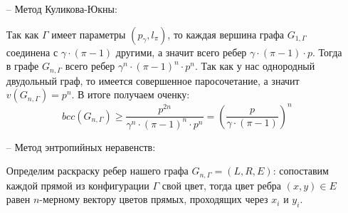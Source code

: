 \documentclass[a4paper]{article}
\newtheorem*{msolution}{Доказательство}
\newtheorem{mlemma}{Лемма}[section]
\begin{document}
\begin{itemize}[noitemsep]
     
     \begin{mlemma}
         Если в $G_{1, \Gamma}$ существует трудное множество размера $k$, то в $G_{n, \Gamma}$ 
         существует трудное множество размера $k^n$
     \end{mlemma}
     \begin{msolution}
        Докажем вначале, что если в графе $G_1$ имеется трудное множество размера $n_1$, а в графе 
        $G_2$ -- трудное множество размера $n_2$, тогда в $G_1 \otimes G_2$ можно найти трудное 
        множество размера $n_1\cdot n_2$ (где $\otimes$ - произведение Кронекера). Пусть $\{v_{i,j}\}$ 
        трудное множество в графе $G_1$, тогда в каждой подматрице $v_{i, j}\cdot G_2$ матрицы 
        графа $G_1 \otimes G_2$ рассмотрим клетки, соответствующие трудному множеству графа $G_2$. 
        Всего мы получили $n_1\cdot n_2$ клеток, образующих трудное множество графа $G_1 \otimes G_2$ 
        по построению.
        
        Вернемся к доказательству леммы. Так как матрица графа $G_{n, \Gamma}$ есть не что иное, как 
        Кронекерово произведение $n$ матриц графа $G_{1, \Gamma}$, то мы можем найти трудное множество 
        размера $k^n$. $\square$
     \end{msolution}
     
     В итоге мы получили, что если $\Gamma$ является аналогом полного двудольного графа, то 
     $$bcc(G_{n, \Gamma}) \geq 2^n$$ иначе $$bcc(G_{n, \Gamma}) \geq 3^n$$
     
     \item[--] Метод Куликова-Юкны:
     
     Так как $\Gamma$ имеет параметры $(p_{\gamma}, l_{\pi})$, то каждая вершина графа $G_{1,\Gamma}$ 
     соединена с $\gamma\cdot (\pi - 1)$ другими, а значит всего ребер $\gamma\cdot (\pi - 1)\cdot p$. Тогда в графе 
     $G_{n, \Gamma}$ всего ребер $\gamma^n\cdot (\pi - 1)^n\cdot p^n$. Так как у нас однородный двудольный граф, 
     то имеется совершенное паросочетание, а значит $v(G_{n, \Gamma}) = p^n$. В итоге получаем оченку:
     $$bcc(G_{n,\Gamma}) \geq \frac{p^{2n}}{\gamma^n\cdot (\pi - 1)^n\cdot p^n} = \left(\frac{p}{\gamma\cdot (\pi -1)}\right)^n$$
     
     \item[--] Метод энтропийных неравенств:
     
     Определим раскраску ребер нашего графа $G_{n,\Gamma} = (L, R, E)$: сопоставим каждой прямой из
     конфигурации $\Gamma$ свой цвет, тогда цвет ребра $(x, y)\in E$ равен $n$-мерному вектору цветов 
     прямых, проходящих через $x_i$ и  $y_i$.
     

\end{itemize}
\end{document}
